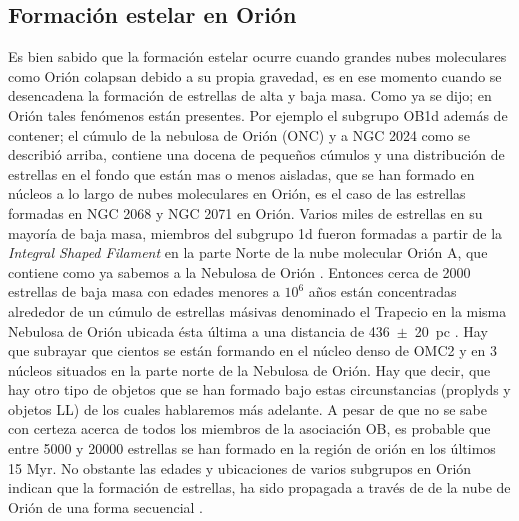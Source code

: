 \subsection{Formación estelar en Orión}
\label{sec:frormacion}

Es bien sabido que la formación estelar ocurre cuando grandes nubes moleculares como Orión colapsan debido a su propia gravedad, es en ese momento cuando se desencadena la formación de estrellas de alta y baja masa. Como ya se dijo; en Orión tales fenómenos están presentes. Por ejemplo el subgrupo OB1d además de contener; el cúmulo de la nebulosa de Orión (ONC) y a NGC 2024 como se describió arriba, contiene  una docena de pequeños cúmulos y una distribución de estrellas en el fondo que están mas o menos aisladas, que se han formado en núcleos a lo largo de nubes moleculares en Orión, es el caso de las estrellas formadas en NGC 2068 y NGC 2071 en Orión. Varios miles de estrellas en su mayoría de baja masa, miembros del subgrupo 1d fueron formadas a partir de la \textit{Integral Shaped Filament} \citep{Bally:1987} en la parte Norte de la nube molecular Orión A, que contiene como ya sabemos a la Nebulosa de Orión \citep{Johnstone:1999}. Entonces cerca de 2000 estrellas de baja masa con edades menores a \(10^6\) años están concentradas alrededor de un cúmulo de estrellas másivas denominado el Trapecio en la misma Nebulosa de Orión \citep{Hillenbrand:1997} ubicada ésta última a una distancia de 436~\(\pm\)~20~pc \citep{Odell:2008a}. Hay que subrayar que  cientos se están formando en el núcleo denso de OMC2 y en 3 núcleos situados en la parte norte de la Nebulosa de Orión. Hay que decir, que hay otro tipo de objetos que se han formado bajo estas circunstancias (proplyds y objetos LL) de los cuales hablaremos más adelante. A pesar de que no se sabe con certeza acerca de todos los miembros de la asociación OB, es probable que entre 5000 y 20000 estrellas se han formado en la región de orión en los últimos 15 Myr. No obstante las edades y ubicaciones de varios subgrupos en Orión indican que la formación de estrellas, ha sido propagada a través de de la nube de Orión de una forma secuencial \citep{Bally:2008a}. \\  
 
